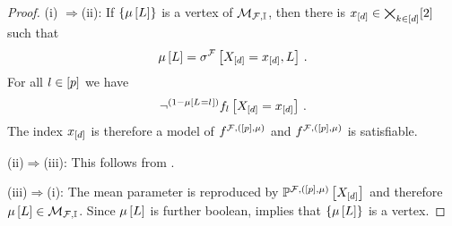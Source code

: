 \begin{proof}
(i)
    $\Rightarrow$(ii):
    If $\{\mu\left[L\right]\}$ is a vertex of $\mathcal{M}_{\mathcal{F},\mathbb{I}}$, then there is $x_{[d]}\in\bigtimes_{k\in[d]}[2]$ such that %
    \begin{align*}
        \mu\left[L\right] = \sigma^{\mathcal{F}}\left[X_{[d]}=x_{[d]},L\right] \, .
    \end{align*}
    For all $l\in[p]$ we have
    \begin{align*}
        \lnot^{(1-\mu\left[L_{}=l_{}\right])}f_{l}\left[X_{[d]}=x_{[d]}\right] \, .
    \end{align*}
    The index $x_{[d]}$ is therefore a model of $f^{\mathcal{F},([p],\mu)}$ and $f^{\mathcal{F},([p],\mu)}$ is satisfiable.

    (ii)$\Rightarrow$(iii):
    This follows from .

    (iii)$\Rightarrow$(i):
    The mean parameter is reproduced by $\mathbb{P}^{\mathcal{F},([p],\mu)}\left[X_{[d]}\right]$ and therefore $\mu\left[L\right]\in\mathcal{M}_{\mathcal{F},\mathbb{I}}$.
    Since $\mu\left[L\right]$ is further boolean,  implies that $\{\mu\left[L\right]\}$ is a vertex.
\end{proof}

